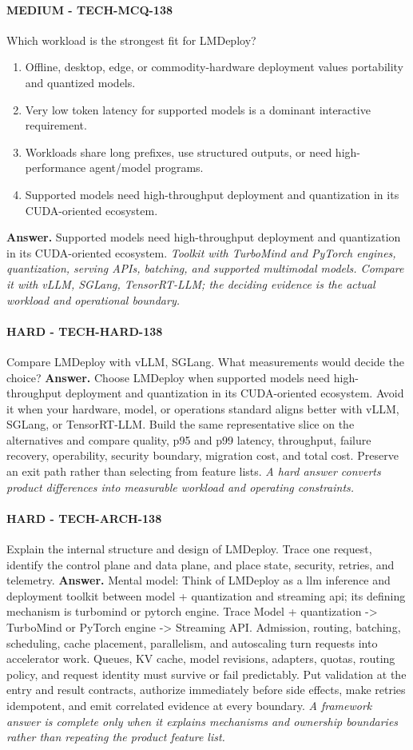 \paragraph{MEDIUM - TECH-MCQ-138} Which workload is the strongest fit for LMDeploy?
\begin{enumerate}[label=\Alph*.]
\item Offline, desktop, edge, or commodity-hardware deployment values portability and quantized models.
\item Very low token latency for supported models is a dominant interactive requirement.
\item Workloads share long prefixes, use structured outputs, or need high-performance agent/model programs.
\item Supported models need high-throughput deployment and quantization in its CUDA-oriented ecosystem.
\end{enumerate}
\textbf{Answer.} Supported models need high-throughput deployment and quantization in its CUDA-oriented ecosystem.
\textit{Toolkit with TurboMind and PyTorch engines, quantization, serving APIs, batching, and supported multimodal models. Compare it with vLLM, SGLang, TensorRT-LLM; the deciding evidence is the actual workload and operational boundary.}
\paragraph{HARD - TECH-HARD-138} Compare LMDeploy with vLLM, SGLang. What measurements would decide the choice?
\textbf{Answer.} Choose LMDeploy when supported models need high-throughput deployment and quantization in its CUDA-oriented ecosystem. Avoid it when your hardware, model, or operations standard aligns better with vLLM, SGLang, or TensorRT-LLM. Build the same representative slice on the alternatives and compare quality, p95 and p99 latency, throughput, failure recovery, operability, security boundary, migration cost, and total cost. Preserve an exit path rather than selecting from feature lists.
\textit{A hard answer converts product differences into measurable workload and operating constraints.}
\paragraph{HARD - TECH-ARCH-138} Explain the internal structure and design of LMDeploy. Trace one request, identify the control plane and data plane, and place state, security, retries, and telemetry.
\textbf{Answer.} Mental model: Think of LMDeploy as a llm inference and deployment toolkit between model + quantization and streaming api; its defining mechanism is turbomind or pytorch engine. Trace Model + quantization -> TurboMind or PyTorch engine -> Streaming API. Admission, routing, batching, scheduling, cache placement, parallelism, and autoscaling turn requests into accelerator work. Queues, KV cache, model revisions, adapters, quotas, routing policy, and request identity must survive or fail predictably. Put validation at the entry and result contracts, authorize immediately before side effects, make retries idempotent, and emit correlated evidence at every boundary.
\textit{A framework answer is complete only when it explains mechanisms and ownership boundaries rather than repeating the product feature list.}
